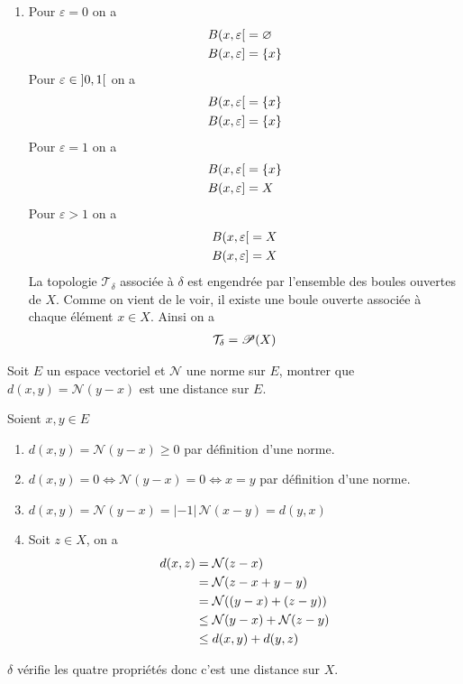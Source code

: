 \documentclass[french,a4paper,10pt]{article}
\begin{document}
\begin{td-sol}
\begin{enumerate}
			\item Pour $\varepsilon=0$ on a
				\[\begin{aligned}
					B({x, \varepsilon}\mathopen{}[\mathclose{}&=\varnothing\\
					B({x, \varepsilon}\mathopen{}]\mathclose{}&=\{x\}
				\end{aligned}\]
				Pour $\varepsilon\in\mathopen{]}0, 1\mathclose{[}$ on a
				\[\begin{aligned}
					B({x, \varepsilon}\mathopen{}[\mathclose{}&=\{x\}\\
					B({x, \varepsilon}\mathopen{}]\mathclose{}&=\{x\}
				\end{aligned}\]
				Pour $\varepsilon= 1$ on a
				\[\begin{aligned}
					B({x, \varepsilon}\mathopen{}[\mathclose{}&=\{x\}\\
					B({x, \varepsilon}\mathopen{}]\mathclose{}&=X
				\end{aligned}\]
				Pour $\varepsilon> 1$ on a
				\[\begin{aligned}
					B({x, \varepsilon}\mathopen{}[\mathclose{}&=X\\
					B({x, \varepsilon}\mathopen{}]\mathclose{}&=X
				\end{aligned}\]
				La topologie $\mathcal{T}_\delta$ associée à $\delta$ est engendrée par l'ensemble des boules ouvertes de $X$. Comme on vient de le voir, il existe une boule ouverte associée à chaque élément $x\in X$. Ainsi on a
				\[\begin{aligned}
					\mathcal{T}_\delta = \mathscr{P}(X)
				\end{aligned}\]
		\end{enumerate}
	\end{td-sol}
	\medspace
	\begin{td-exo}
		Soit $E$ un espace vectoriel et $\mathcal{N}$ une norme sur $E$, montrer que $d(x,y)=\mathcal{N}(y-x)$ est une distance sur $E$.
	\end{td-exo}
	\begin{td-sol}
		Soient $x,y\in E$
		\begin{enumerate}[label=$(\roman*)$]
			\item $d(x, y) = \mathcal{N}(y-x)\ge 0$ par définition d'une norme.
			
			\item $d(x,y) = 0 \Longleftrightarrow \mathcal{N}(y-x) = 0 \Longleftrightarrow x=y$ par définition d'une norme.
			
			\item $d(x,y) =\mathcal{N}(y-x)=|-1|\, \mathcal{N}(x-y)= d(y,x)$
			
			\item Soit $z\in X$, on a
				\[\begin{aligned}
					d(x,z) &= \mathcal{N}(z-x)\\
					&=\mathcal{N}(z-x+y-y)\\
					&=\mathcal{N}((y-x)+(z-y))\\
					&\le \mathcal{N}(y-x)+\mathcal{N}(z-y)\\
					&\le d(x,y)+d(y,z)
				\end{aligned}\]
		\end{enumerate}
		$\delta$ vérifie les quatre propriétés donc c'est une distance sur $X$.
	\end{td-sol}
\end{document}
